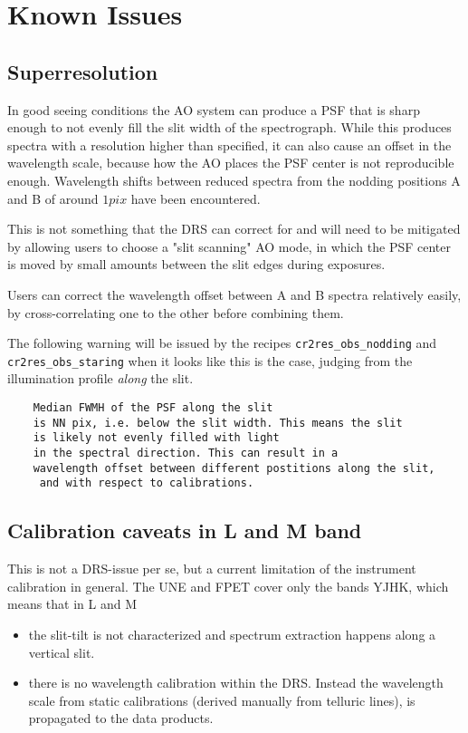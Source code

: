 \section{Known Issues}
\label{sec:knownissues}

\subsection{Superresolution}
In good seeing conditions the AO system can produce a PSF that is sharp enough
to not evenly fill the slit width of the spectrograph. While this produces spectra with a resolution higher than specified, it can also cause an offset in the wavelength scale, because how the AO places the PSF center is not reproducible enough. Wavelength shifts between reduced spectra from the nodding positions A and B of around $1 pix$ have been encountered.

This is not something that the DRS can correct for and will need to be mitigated
by allowing users to choose a "slit scanning" AO mode, in which the PSF center
is moved by small amounts between the slit edges during exposures.

Users can correct the wavelength offset between A and B spectra relatively easily, by cross-correlating one to the other before combining them.

The following warning will be issued by the recipes \verb!cr2res_obs_nodding!
and \verb!cr2res_obs_staring! when it looks like this is the case, judging from
the illumination profile \emph{along} the slit. 
\begin{verbatim}
    Median FWMH of the PSF along the slit 
    is NN pix, i.e. below the slit width. This means the slit 
    is likely not evenly filled with light 
    in the spectral direction. This can result in a 
    wavelength offset between different postitions along the slit,
     and with respect to calibrations.
\end{verbatim}


\subsection{Calibration caveats in L and M band}

This is not a DRS-issue per se, but a current limitation of the instrument
calibration in general. The UNE and FPET cover only the bands YJHK, which means
that in L and M
\begin{itemize}
    \item the slit-tilt is not characterized and spectrum extraction happens
    along a vertical slit.
    \item there is no wavelength calibration within the DRS. Instead the
    wavelength scale from static calibrations (derived manually from telluric
    lines), is propagated to the data products.
\end{itemize}


